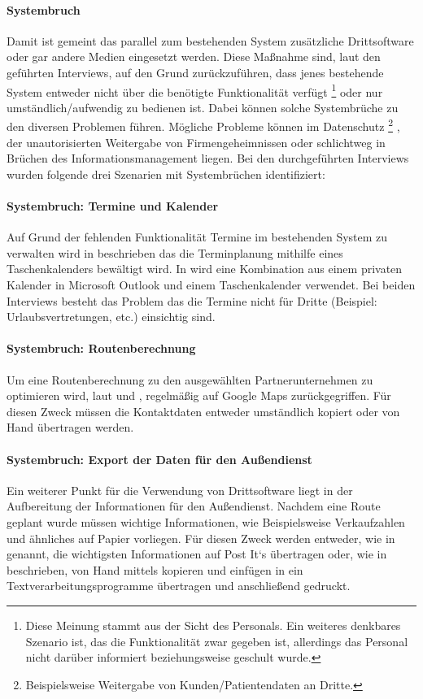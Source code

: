 \documentclass[Bachelorarbeit.tex]{subfiles}
\begin{document}
\paragraph{Systembruch}
\label{interviewsAnalyseSystembruch}
Damit ist gemeint das parallel zum bestehenden System zusätzliche Drittsoftware oder gar andere Medien eingesetzt werden.
Diese Maßnahme sind, laut den geführten Interviews, auf den Grund zurückzuführen, dass jenes bestehende System entweder nicht über die benötigte Funktionalität verfügt
\footnote{
	Diese Meinung stammt aus der Sicht des Personals. 
	Ein weiteres denkbares Szenario ist, das die Funktionalität zwar gegeben ist, allerdings das Personal nicht darüber informiert beziehungsweise geschult wurde.
	} 
oder nur umständlich/aufwendig zu bedienen ist.
Dabei können solche Systembrüche zu den diversen Problemen führen. 
Mögliche Probleme können im Datenschutz
\footnote{
	Beispielsweise Weitergabe von Kunden/Patientendaten an Dritte.
	}
	, der unautorisierten Weitergabe von Firmengeheimnissen oder schlichtweg in Brüchen des Informationsmanagement liegen.  
Bei den durchgeführten Interviews wurden folgende drei Szenarien mit Systembrüchen identifiziert:

\paragraph{Systembruch: Termine und Kalender}
Auf Grund der fehlenden Funktionalität Termine im bestehenden System zu verwalten wird in  beschrieben das die Terminplanung mithilfe eines Taschenkalenders bewältigt wird. 
In  wird eine Kombination aus einem privaten Kalender in Microsoft Outlook und einem Taschenkalender verwendet. 
Bei beiden Interviews besteht das Problem das die Termine nicht für Dritte (Beispiel: Urlaubsvertretungen, etc.) einsichtig sind.

\paragraph{Systembruch: Routenberechnung}
Um eine Routenberechnung zu den ausgewählten Partnerunternehmen zu optimieren wird, laut  und , regelmäßig auf Google Maps zurückgegriffen. 
Für diesen Zweck müssen die Kontaktdaten entweder umständlich kopiert oder von Hand übertragen werden.

\paragraph{Systembruch: Export der Daten für den Außendienst}
Ein weiterer Punkt für die Verwendung von Drittsoftware liegt in der Aufbereitung der Informationen für den Außendienst.
Nachdem eine Route geplant wurde müssen wichtige Informationen, wie Beispielsweise Verkaufzahlen und ähnliches auf Papier vorliegen. 
Für diesen Zweck werden entweder, wie in  genannt, die wichtigsten Informationen auf Post It`s übertragen oder, wie in  beschrieben, von Hand mittels kopieren und einfügen in ein Textverarbeitungsprogramme übertragen und anschließend gedruckt.
\end{document}
